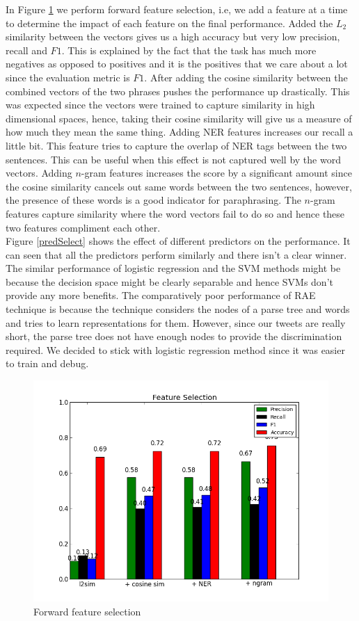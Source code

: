 \documentclass[conference]{IEEEtran}
\begin{document}
\indent In Figure \ref{feat} we perform forward feature selection, i.e, we add a feature at a time to determine the impact of each feature on the final performance. Added the $L_2$ similarity between the vectors gives us a high accuracy but very low precision, recall and $F1$. This is explained by the fact that the task has much more negatives as opposed to positives and it is the positives that we care about a lot since the evaluation metric is $F1$. After adding the cosine similarity between the combined vectors of the two phrases pushes the performance up drastically. This was expected since the vectors were trained to capture similarity in high dimensional spaces, hence, taking their cosine similarity will give us a measure of how much they mean the same thing. Adding NER features increases our recall a little bit. This feature tries to capture the overlap of NER tags between the two sentences. This can be useful when this effect is not captured well by the word vectors. Adding $n$-gram features increases the score by a significant amount since the cosine similarity cancels out same words between the two sentences, however, the presence of these words is a good indicator for paraphrasing. The $n$-gram features capture similarity where the word vectors fail to do so and hence these two features compliment each other.\\

\indent Figure \ref{predSelect} shows the effect of different predictors on the performance. It can seen that all the predictors perform similarly and there isn't a clear winner. The similar performance of logistic regression and the SVM methods might be because the decision space might be clearly separable and hence SVMs don't provide any more benefits. The comparatively poor performance of RAE technique is because the technique considers the nodes of a parse tree and words and tries to learn representations for them. However, since our tweets are really short, the parse tree does not have enough nodes to provide the discrimination required. We decided to stick with logistic regression method since it was easier to train and debug.\\
\begin{figure}
	\centering
	\includegraphics[scale=0.4]{ft_select.png}
	\caption{Forward feature selection}
	\label{feat}
\end{figure}
\end{document}
